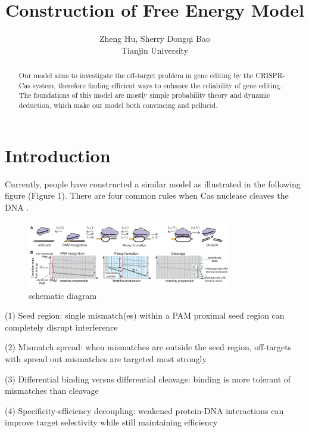 \documentclass[a4paper,10pt]{article}
\title{Construction of Free Energy Model}
\author{Zheng Hu, Sherry Dongqi Bao \\ Tianjin University}
\begin{document}
	\maketitle

	\begin{abstract}
	Our model aims to investigate the off-target problem in gene editing by the CRISPR-Cas system, therefore finding efficient ways to enhance the reliability of gene editing. The foundations of this model are mostly simple probability theory and dynamic deduction, which make our model both convincing and pellucid.
	\end{abstract}
	
	
	\printbibliography
	\section{Introduction}
	Currently, people have constructed a similar model as illustrated in the following figure (Figure 1). There are four common rules when Cas nuclease cleaves the DNA \parencite{KLEIN20181413} 
	.
		\begin{figure}[tbph]
		\centering
		\includegraphics[width=3.5in]{1}
		\caption{schematic diagram}
		\label{fig:1}
		\end{figure}

	(1) Seed region: single mismatch(es) within a PAM proximal seed region can completely disrupt interference\par
	(2) Mismatch spread: when mismatches are outside the seed region, off-targets with spread out mismatches are targeted most strongly\par
	(3) Differential binding versus differential cleavage: binding is more tolerant of mismatches than cleavage\par 
	(4) Specificity-efficiency decoupling: weakened protein-DNA interactions can improve target selectivity while still maintaining efficiency\par
	
\end{document}
